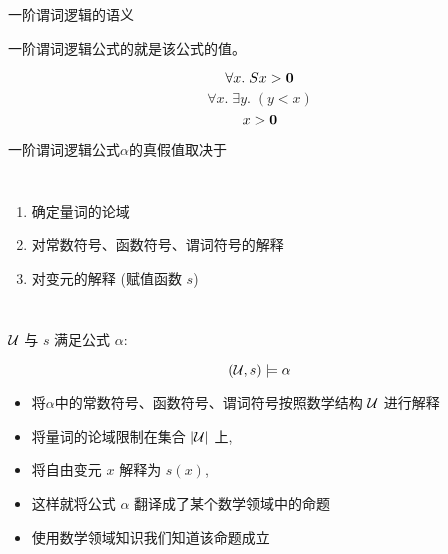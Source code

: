 
\begin{frame}{}
  \begin{center}
    一阶谓词逻辑的语义

  \end{center}
\end{frame}

\begin{frame}{}
  \begin{center}
    一阶谓词逻辑公式的就是该公式的值。

    \[
      \forall x.\; Sx > {\bf 0}
    \]
    \pause
    \[
      \forall x.\; \exists y.\; (y < x)
    \]
    \pause
    \[
      x > {\bf 0}
    \]

    \pause
    \vspace{0.60cm}
    一阶谓词逻辑公式$\alpha$的真假值取决于
    \begin{columns}
        \begin{enumerate}[(1)]
          \setlength{\itemsep}{6pt}
          \item 确定量词的论域
          \item 对常数符号、函数符号、谓词符号的解释
          \item 对变元的解释 (赋值函数 $s$)
        \end{enumerate}
    \end{columns}

    \pause
    \vspace{0.60cm}
  \end{center}
\end{frame}

\begin{frame}{}
  \begin{definition}
    \begin{center}
      $\mathcal{U}$ 与 $s$ 满足公式 $\alpha$:
    \end{center}
    \[
      (\mathcal{U}, s) \models \alpha
    \]
    \begin{itemize}
      \item 将$\alpha$中的常数符号、函数符号、谓词符号按照数学结构 $\mathcal{U}$ 进行解释
      \item 将量词的论域限制在集合 $|\mathcal{U}|$ 上,
      \item 将自由变元 $x$ 解释为 $s(x)$,
      \item 这样就将公式 $\alpha$ 翻译成了某个数学领域中的命题
      \item 使用数学领域知识我们知道该命题成立
    \end{itemize}
  \end{definition}
\end{frame}

